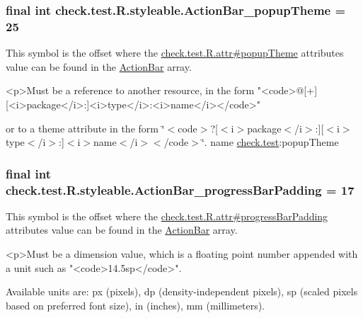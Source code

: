 \subsubsection[{Action\+Bar\+\_\+popup\+Theme}]{\setlength{\rightskip}{0pt plus 5cm}final int check.\+test.\+R.\+styleable.\+Action\+Bar\+\_\+popup\+Theme = 25\hspace{0.3cm}{\ttfamily [static]}}\label{classcheck_1_1test_1_1_r_1_1styleable_a50824fb411f147909363103d29b2ac25}
This symbol is the offset where the \hyperlink{classcheck_1_1test_1_1_r_1_1attr_a80b43c587b8929227394e17102b18eb4}{check.\+test.\+R.\+attr\#popup\+Theme} attribute\textquotesingle{}s value can be found in the \hyperlink{classcheck_1_1test_1_1_r_1_1styleable_ad0a4d403cb244ea4d22c6f6ebf2c2cdf}{Action\+Bar} array.

\begin{DoxyVerb}      <p>Must be a reference to another resource, in the form "<code>@[+][<i>package</i>:]<i>type</i>:<i>name</i></code>"
\end{DoxyVerb}
 or to a theme attribute in the form \char`\"{}$<$code$>$?\mbox{[}$<$i$>$package$<$/i$>$\+:\mbox{]}\mbox{[}$<$i$>$type$<$/i$>$\+:\mbox{]}$<$i$>$name$<$/i$>$$<$/code$>$\char`\"{}.  name \hyperlink{namespacecheck_1_1test}{check.\+test}\+:popup\+Theme \hypertarget{classcheck_1_1test_1_1_r_1_1styleable_a535160a98b5036d981b4bc255935336a}{}
\subsubsection[{Action\+Bar\+\_\+progress\+Bar\+Padding}]{\setlength{\rightskip}{0pt plus 5cm}final int check.\+test.\+R.\+styleable.\+Action\+Bar\+\_\+progress\+Bar\+Padding = 17\hspace{0.3cm}{\ttfamily [static]}}\label{classcheck_1_1test_1_1_r_1_1styleable_a535160a98b5036d981b4bc255935336a}
This symbol is the offset where the \hyperlink{classcheck_1_1test_1_1_r_1_1attr_a48d0f556721f22983ce0941643a36463}{check.\+test.\+R.\+attr\#progress\+Bar\+Padding} attribute\textquotesingle{}s value can be found in the \hyperlink{classcheck_1_1test_1_1_r_1_1styleable_ad0a4d403cb244ea4d22c6f6ebf2c2cdf}{Action\+Bar} array.

\begin{DoxyVerb}      <p>Must be a dimension value, which is a floating point number appended with a unit such as "<code>14.5sp</code>".
\end{DoxyVerb}
 Available units are\+: px (pixels), dp (density-\/independent pixels), sp (scaled pixels based on preferred font size), in (inches), mm (millimeters). 

